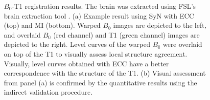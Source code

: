\begin{figure}[t!]
\centering
    \caption{{\small $B_{0}$-T1 registration results. The brain was extracted using FSL's brain extraction tool \cite{Smith2012hbm}. (a) Example result using SyN with ECC (top) and MI (bottom). Warped $B_{0}$ images are depicted to the left, and overlaid $B_{0}$ (red channel) and T1 (green channel) images are depicted to the right. Level curves of the warped $B_{0}$ were overlaid on top of the T1 to visually assess local structure agreement. Visually, level curves obtained with ECC have a better correspondence with the structure of the T1. (b) Visual assessment from panel (a) is confirmed by the quantitative results using the indirect validation procedure.}}
\label{fig:comparison_B0_T1_coregistration}\figcloser
\end{figure}
